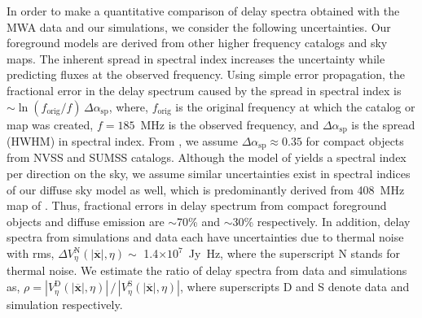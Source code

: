 \documentclass[preprint2,iop,numberedappendix]{emulateapj}
\begin{document}
In order to make a quantitative comparison of delay spectra obtained with the MWA data and our simulations, we consider the following uncertainties. Our foreground models are derived from other higher frequency catalogs and sky maps. The inherent spread in spectral index increases the uncertainty while predicting fluxes at the observed frequency. Using simple error propagation, the fractional error in the delay spectrum caused by the spread in spectral index is $\sim \ln(f_\textrm{orig}/f)\,\Delta\alpha_\textrm{sp}$, where, $f_\textrm{orig}$ is the original frequency at which the catalog or map was created, $f=185$~MHz is the observed frequency, and $\Delta\alpha_\textrm{sp}$ is the spread (HWHM) in spectral index. From \citet{mau03}, we assume $\Delta\alpha_\textrm{sp} \approx 0.35$ for compact objects from NVSS and SUMSS catalogs. Although the model of \citet{deo08} yields a spectral index per direction on the sky, we assume similar uncertainties exist in spectral indices of our diffuse sky model as well, which is predominantly derived from 408~MHz map of \citet{has82}. Thus, fractional errors in delay spectrum from compact foreground objects and diffuse emission are $\sim$70\% and $\sim$30\% respectively. In addition, delay spectra from simulations and data each have uncertainties due to thermal noise with rms, $\Delta V^\textrm{N}_\eta(|\overline{\mathbf{x}}|,\eta) \sim$ 1.4$\times 10^7$~Jy~Hz, where the superscript N stands for thermal noise. We estimate the ratio of delay spectra from data and simulations as, $\rho = |V^\textrm{D}_\eta(|\overline{\mathbf{x}}|,\eta)|\,/\,|V^\textrm{S}_\eta(|\overline{\mathbf{x}}|,\eta)|$, where superscripts D and S denote data and simulation respectively. %

\end{document}
